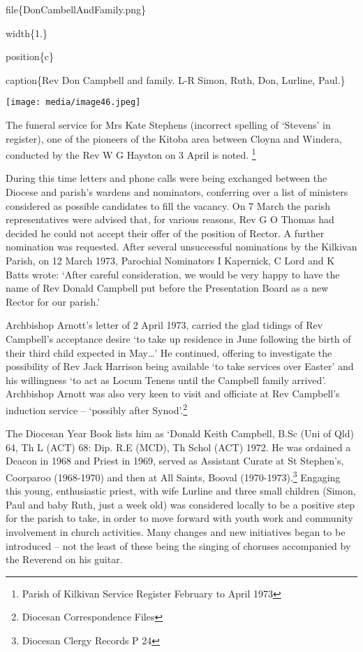 file\{DonCambellAndFamily.png\}

width\{1.\}

position\{c\}

caption\{Rev Don Campbell and family. L-R Simon, Ruth, Don, Lurline, Paul.\}

\texttt{[image: media/image46.jpeg]}

The funeral service for Mrs Kate Stephens (incorrect spelling of `Stevens' in register), one of the pioneers of the Kitoba area between Cloyna and Windera, conducted by the Rev W G Hayston on 3 April is noted. \footnote{Parish of Kilkivan Service Register February to April 1973}

During this time letters and phone calls were being exchanged between the Diocese and parish's wardens and nominators, conferring over a list of ministers considered as possible candidates to fill the vacancy. On 7 March the parish representatives were advised that, for various reasons, Rev G O Thomas had decided he could not accept their offer of the position of Rector. A further nomination was requested. After several unsuccessful nominations by the Kilkivan Parish, on 12 March 1973, Parochial Nominators I Kapernick, C Lord and K Batts wrote: `After careful consideration, we would be very happy to have the name of Rev Donald Campbell put before the Presentation Board as a new Rector for our parish.'

Archbishop Arnott's letter of 2 April 1973, carried the glad tidings of Rev Campbell's acceptance desire `to take up residence in June following the birth of their third child expected in May\ldots' He continued, offering to investigate the possibility of Rev Jack Harrison being available `to take services over Easter' and his willingness `to act as Locum Tenens until the Campbell family arrived'. Archbishop Arnott was also very keen to visit and officiate at Rev Campbell's induction service -- `possibly after Synod'.\footnote{Diocesan Correspondence Files}

The Diocesan Year Book lists him as `Donald Keith Campbell, B.Sc (Uni of Qld) 64, Th L (ACT) 68: Dip. R.E (MCD), Th Schol (ACT) 1972. He was ordained a Deacon in 1968 and Priest in 1969, served as Assistant Curate at St Stephen's, Coorparoo (1968-1970) and then at All Saints, Booval (1970-1973).\footnote{Diocesan Clergy Records P 24} Engaging this young, enthusiastic priest, with wife Lurline and three small children (Simon, Paul and baby Ruth, just a week old) was considered locally to be a positive step for the parish to take, in order to move forward with youth work and community involvement in church activities. Many changes and new initiatives began to be introduced -- not the least of these being the singing of choruses accompanied by the Reverend on his guitar.

